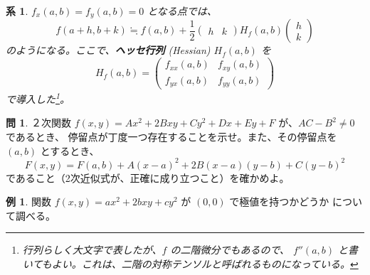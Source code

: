 \documentclass[a4paper]{jsarticle}
\newtheorem{Corollary}[Theorem]{系}
\theoremstyle{definition}
\newtheorem{Example}[Theorem]{例}
\newtheorem{Exercise}{問}%
\theoremstyle{remark}
\begin{document}
\begin{Corollary}
$f_x(a,b) = f_y(a,b) = 0$ となる点では、
\[
f(a+h,b+k) \fallingdotseq f(a,b) + \frac{1}{2} 
\begin{pmatrix}
h & k
\end{pmatrix}
H_f(a,b)
\begin{pmatrix}
h\\
k
\end{pmatrix}
\]
のようになる。ここで、\textbf{ヘッセ行列} 
{\rm (Hessian)}
$H_f(a,b)$ を
\[
H_f(a,b) = 
\begin{pmatrix}
f_{xx}(a,b) & f_{xy}(a,b)\\
f_{yx}(a,b) & f_{yy}(a,b)
\end{pmatrix}
\]
で導入した\footnote{行列らしく大文字で表したが、$f$ の二階微分でもあるので、
$f''(a,b)$ と書いてもよい。これは、二階の対称テンソルと呼ばれるものになっている。
}。
\end{Corollary}

\begin{Exercise}
２次関数 $f(x,y) = Ax^2 + 2Bxy + Cy^2 + Dx + Ey + F$ が、$AC-B^2 \not= 0$ であるとき、
停留点が丁度一つ存在することを示せ。また、その停留点を $(a,b)$ とするとき、
\[
F(x,y) = F(a,b) + A(x-a)^2 + 2B(x-a)(y-b) + C(y-b)^2
\]
であること（2次近似式が、正確に成り立つこと）を確かめよ。
\end{Exercise}

\begin{Example}
関数 $f(x,y) = ax^2 + 2bxy + cy^2$ が $(0,0)$ で極値を持つかどうか
について調べる。
\end{Example}
\end{document}

